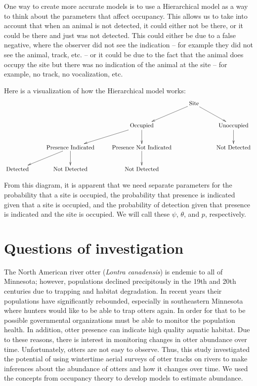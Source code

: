 \documentclass[12pt]{article}
\begin{document}
    One way to create more accurate models is to use a Hierarchical model as a
    way to think about the parameters that affect occupancy. This allows us to
    take into account that when an animal is not detected, it could either not
    be there, or it could be there and just was not detected. This could either
    be due to a false negative, where the observer did not see the indication --
    for example they did not see the animal, track, etc. -- or it could be due
    to the fact that the animal does occupy the site but there was no indication
    of the animal at the site -- for example, no track, no vocalization, etc.

    Here is a visualization of how the Hierarchical model works:
    \begin{displaymath}
        \xymatrix{
        & & & \text{Site}\ar[dl]\ar[dr] & \\
        & & \text{Occupied}\ar[dl]\ar[d] & & \text{Unoccupied}\ar[d] \\
        & \text{Presence Indicated}\ar[dl]\ar[d] & 
          \text{Presence Not Indicated}\ar[d] & & \text{Not Detected} \\
        \text{Detected} & \text{Not Detected} & \text{Not Detected} & &}
    \end{displaymath}

    From this diagram, it is apparent that we need separate parameters for the
    probability that a site is occupied, the probability that presence is
    indicated given that a site is occupied, and the probability of detection
    given that presence is indicated and the site is occupied. We will call
    these \(\psi\), \(\theta\), and \(p\), respectively.

\section{Questions of investigation}
The North American river otter (\textit{Lontra canadensis}) is endemic to all of
Minnesota; however, populations declined precipitously in the 19th and 20th
centuries due to trapping and habitat degradation. In recent years their
populations have significantly rebounded, especially in southeastern Minnesota
where hunters would like to be able to trap otters again. In order for that to
be possible governmental organizations must be able to monitor the population
health. In addition, otter presence can indicate high quality aquatic habitat.
Due to these reasons, there is interest in monitoring changes in otter abundance
over time. Unfortunately, otters are not easy to observe. Thus, this study
investigated the potential of using wintertime aerial surveys of otter tracks on
rivers to make inferences about the abundance of otters and how it changes over
time. We used the concepts from occupancy theory to develop models to estimate
abundance.
\end{document}
